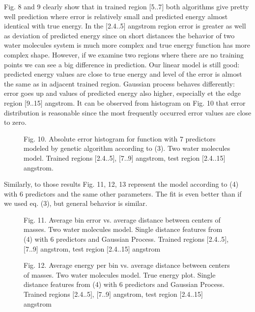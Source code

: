 \documentclass[aps,prl,reprint,amsmath,amssymb,nature]{revtex4-1}
\begin{document}
Fig. 8 and 9 clearly show that in trained region $[$5..7$]$ both 
algorithms give pretty well prediction where error is relatively small 
and predicted energy almost identical with true energy. In the 
$[$2.4..5$]$ angstrom region error is greater as well as deviation of 
predicted energy since on short distances the behavior of two water 
molecules system is much more complex and true energy function has more 
complex shape. However, if we examine two regions where there are no 
training points we can see a big difference in prediction. Our linear 
model is still good: predicted energy values are close to true energy 
and level of the error is almost the same as in adjacent trained region. 
Gaussian process behaves differently: error goes up and values of 
predicted energy also higher, especially et the edge region $[$9..15$]$ 
angstrom. It can be observed from histogram on Fig. 10 that error 
distribution is reasonable since the most frequently occurred error 
values are close to zero.

\begin{figure}[h]
\centering
\caption{Fig. 10. Absolute error histogram for function with 7 
predictors modeled by genetic algorithm according to (3). Two water 
molecules model. Trained regions $[$2.4..5$]$, $[$7..9$]$ angstrom, test 
region $[$2.4..15$]$ angstrom.}
\end{figure}

Similarly, to those results Fig. 11, 12, 13 represent the model 
according to (4) with 6 predictors and the same other parameters. The 
fit is even better than if we used eq. (3), but general behavior is 
similar.

\begin{figure}[h]
\centering
\caption{Fig. 11. Average bin error vs. average distance between centers 
of masses. Two water molecules model. Single distance features from (4) 
with 6 predictors and Gaussian Process. Trained regions $[$2.4..5$]$, 
$[$7..9$]$ angstrom, test region $[$2.4..15$]$ angstrom}
\end{figure}

\begin{figure}[h]
\centering
\caption{Fig. 12. Average energy per bin vs. average distance between 
centers of masses. Two water molecules model. True energy plot. Single 
distance features from (4) with 6 predictors and Gaussian Process. 
Trained regions $[$2.4..5$]$, $[$7..9$]$ angstrom, test region 
$[$2.4..15$]$ angstrom}
\end{figure}
\end{document}
